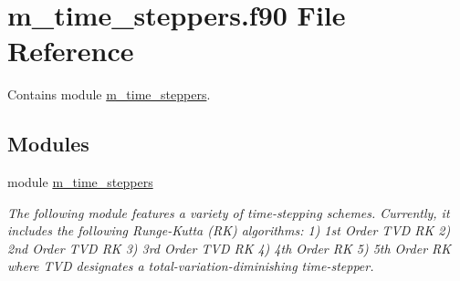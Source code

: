 \hypertarget{m__time__steppers_8f90}{}\section{m\+\_\+time\+\_\+steppers.\+f90 File Reference}
\label{m__time__steppers_8f90}


Contains module \hyperlink{namespacem__time__steppers}{m\+\_\+time\+\_\+steppers}.  


\subsection*{Modules}
\begin{DoxyCompactItemize}
\item 
module \hyperlink{namespacem__time__steppers}{m\+\_\+time\+\_\+steppers}
\begin{DoxyCompactList}\small\item\em The following module features a variety of time-\/stepping schemes. Currently, it includes the following Runge-\/\+Kutta (RK) algorithms\+: 1) 1st Order T\+VD RK 2) 2nd Order T\+VD RK 3) 3rd Order T\+VD RK 4) 4th Order RK 5) 5th Order RK where T\+VD designates a total-\/variation-\/diminishing time-\/stepper. \end{DoxyCompactList}\end{DoxyCompactItemize}
